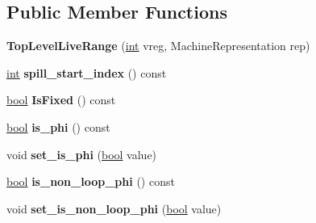 \subsection*{Public Member Functions}
\begin{DoxyCompactItemize}
\item 
\mbox{\label{classv8_1_1internal_1_1compiler_1_1TopLevelLiveRange_a6c74e403124fe51fef5636c52a029605}} 
{\bfseries Top\+Level\+Live\+Range} (\mbox{\hyperlink{classint}{int}} vreg, Machine\+Representation rep)
\item 
\mbox{\label{classv8_1_1internal_1_1compiler_1_1TopLevelLiveRange_acce1b03c414ec14a5675c416a9925c7d}} 
\mbox{\hyperlink{classint}{int}} {\bfseries spill\+\_\+start\+\_\+index} () const
\item 
\mbox{\label{classv8_1_1internal_1_1compiler_1_1TopLevelLiveRange_accb3edfd8ddc7d476821e76fb8c0a5f9}} 
\mbox{\hyperlink{classbool}{bool}} {\bfseries Is\+Fixed} () const
\item 
\mbox{\label{classv8_1_1internal_1_1compiler_1_1TopLevelLiveRange_a302e156b9b6a87904649361900839044}} 
\mbox{\hyperlink{classbool}{bool}} {\bfseries is\+\_\+phi} () const
\item 
\mbox{\label{classv8_1_1internal_1_1compiler_1_1TopLevelLiveRange_a3586500c1cbdd083f93948478963e537}} 
void {\bfseries set\+\_\+is\+\_\+phi} (\mbox{\hyperlink{classbool}{bool}} value)
\item 
\mbox{\label{classv8_1_1internal_1_1compiler_1_1TopLevelLiveRange_ac18e8701e4f3f5f4adef46939428ba7b}} 
\mbox{\hyperlink{classbool}{bool}} {\bfseries is\+\_\+non\+\_\+loop\+\_\+phi} () const
\item 
\mbox{\label{classv8_1_1internal_1_1compiler_1_1TopLevelLiveRange_a2a2460a3817ed77756ed48d5de31b310}} 
void {\bfseries set\+\_\+is\+\_\+non\+\_\+loop\+\_\+phi} (\mbox{\hyperlink{classbool}{bool}} value)

\end{DoxyCompactItemize}

